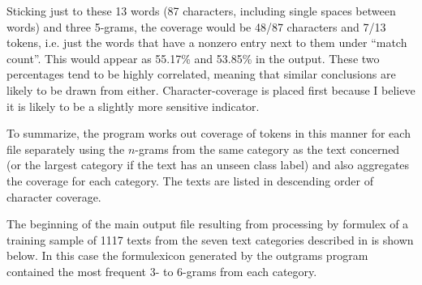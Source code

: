 \documentclass[output=paper]{langscibook}
\begin{document}
Sticking just to these 13 words (87 characters, including single spaces between words) and three 5-grams, the coverage would be 48/87 characters and 7/13 tokens, i.e. just the words that have a nonzero entry next to them under ``match count''. This would appear as 55.17\% and 53.85\% in the output. These two percentages tend to be highly correlated, meaning that similar conclusions are likely to be drawn from either. Character-coverage is placed first because I believe it is likely to be a slightly more sensitive indicator.

To summarize, the program works out coverage of tokens in this manner for each file separately using the $n$-grams from the same category as the text concerned (or the largest category if the text has an unseen class label) and also aggregates the coverage for each category. The texts are listed in descending order of character coverage.

The beginning of the main output file resulting from processing by formulex of a training sample of 1117 texts from the seven text categories described in  is shown below. In this case the formulexicon generated by the outgrams program contained the most frequent 3- to 6-grams from each category.\bigskip
\end{document}
